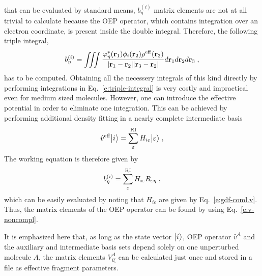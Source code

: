 that can be evaluated by standard means,
$b^{(i)}_\eta$ matrix elements are not at all trivial to calculate
because the OEP operator, which contains integration over an electron coordinate,
is present inside the double integral. Therefore, the following triple integral,
%
\begin{equation} \label{e:triple-integral}
 b^{(i)}_\eta = \iiint 
           \frac{ \varphi^*_\eta({\bf r}_1) \phi_i({\bf r}_2)  \rho^{\rm eff}({\bf r}_3) }
            {\vert {\bf r}_1 - {\bf r}_2 \vert \vert {\bf r}_3 - {\bf r}_2 \vert}
           d{\bf r}_1 d{\bf r}_2 d{\bf r}_3 \;,
\end{equation}
%
has to be computed.
Obtaining all the necessery integrals of this kind directly 
by performing integrations in Eq.~\eqref{e:triple-integral} is very costly 
and impractical even for medium sized molecules. 
However, one can introduce the effective potential in order to eliminate one integration. 
This can be achieved by performing additional density fitting in a nearly complete intermediate basis 
%
\begin{equation}
 \hat{v}^{\rm eff} \Ket{i} = \sum_\varepsilon^{\rm RI} H_{i\varepsilon} \Ket{\varepsilon} \;,
\end{equation}
%
The working equation is therefore given by
%
\begin{equation}
 b^{(i)}_\eta = \sum_\varepsilon^{\rm RI} H_{i\varepsilon} R_{\varepsilon\eta} \;,
\end{equation}
%
which can be easily evaluated by noting that
$H_{i\varepsilon}$ are given by Eq.~\eqref{e:gdf-coml.v}.
Thus, the matrix elements of the OEP operator can be found
by using Eq.~\eqref{e:v-noncompl}.

It is emphasized here that, as long as the state vector $\Ket{i}$, OEP operator $\hat{v}^A$ 
and the auxiliary and intermediate basis sets depend solely on one unperturbed molecule $A$, the matrix elements
$V^A_{i\xi}$ can be calculated just once and stored in a file as effective fragment parameters.


